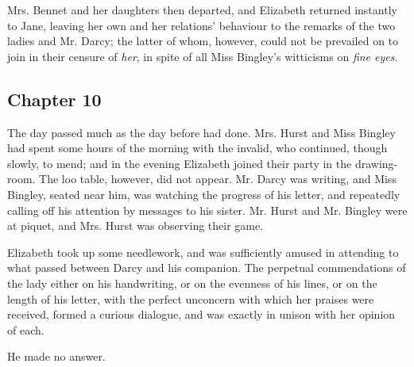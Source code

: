 Mrs. Bennet and her daughters then departed, and Elizabeth returned instantly to Jane, leaving her own and her relations' behaviour to the remarks of the two ladies and Mr. Darcy; the latter of whom, however, could not be prevailed on to join in their censure of {\em her}, in spite of all Miss Bingley's witticisms on {\em fine eyes}.

\subsection[chapter-10]{\useURL[url10][][][]\from[url10] Chapter 10}

The day passed much as the day before had done. Mrs. Hurst and Miss Bingley had spent some hours of the morning with the invalid, who continued, though slowly, to mend; and in the evening Elizabeth joined their party in the drawing-room. The loo table, however, did not appear. Mr. Darcy was writing, and Miss Bingley, seated near him, was watching the progress of his letter, and repeatedly calling off his attention by messages to his sister. Mr. Hurst and Mr. Bingley were at piquet, and Mrs. Hurst was observing their game.

Elizabeth took up some needlework, and was sufficiently amused in attending to what passed between Darcy and his companion. The perpetual commendations of the lady either on his handwriting, or on the evenness of his lines, or on the length of his letter, with the perfect unconcern with which her praises were received, formed a curious dialogue, and was exactly in unison with her opinion of each.


He made no answer.








